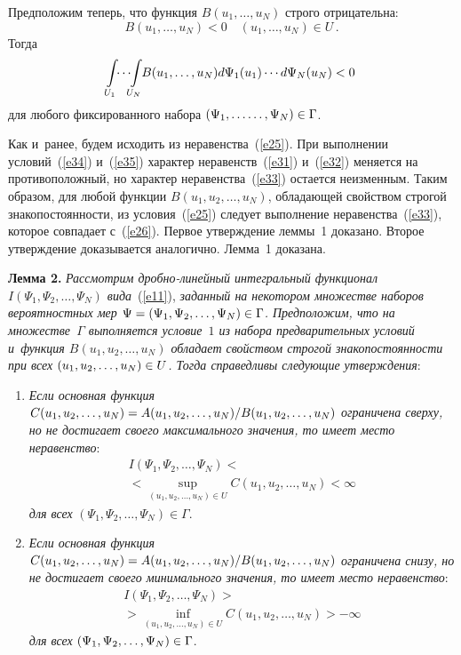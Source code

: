 \begin{multicols}{2}
Предположим теперь, что функция $B(u_1,\ldots, u_N)$ строго отрицательна:
\begin{equation}
B(u_1,\ldots, u_N)<0 \quad \left(u_1, \ldots, u_N\right)\in U\,. 
\label{e34}
\end{equation}
Тогда
\begin{multline}
\hspace*{-6pt}\int\limits_{U_1}\!\!\cdots\!\! \int\limits_{U_N}\!\!B\!\left(u_1,\ldots, u_N\right)\!
 d\Psi_1(u_1) \cdots d\Psi_N(u_N)<0 \!\!\!
 \label{e35}
\end{multline}
для любого фиксированного набора $(\Psi_1, \ldots\linebreak \ldots, \Psi_N)\hm\in \Gamma$.

Как и~ранее, будем исходить из неравенства~(\ref{e25}). 
При выполнении условий~(\ref{e34}) и~(\ref{e35}) характер неравенств~(\ref{e31}) 
и~(\ref{e32}) меняется на противоположный, но характер неравенства~(\ref{e33}) 
остается неизменным. Таким образом, для любой функции 
$B(u_1, u_2,\ldots, u_N)$, обладающей свойством строгой знакопостоянности, 
из условия~(\ref{e25}) следует выполнение неравенства~(\ref{e33}), 
которое совпадает с~(\ref{e26}). Первое утверждение леммы~1 доказано. 
Второе утверждение доказывается аналогично. Лемма~1 доказана.

\smallskip

\noindent
\textbf{Лемма 2.} \textit{Рассмотрим дроб\-но-ли\-ней\-ный интегральный функционал 
$I(\Psi_1, \Psi_2,\ldots, \Psi_N)$ вида}~(\ref{e11}), 
\textit{заданный на некотором множестве наборов вероятностных мер 
$\Psi\hm=(\Psi_1, \Psi_2,\ldots, \Psi_N)\hm\in \Gamma$. Предпо\-ложим, что на 
множестве~$\Gamma$ выполняется условие~$1$ из набора предварительных условий 
и~функция $B(u_1, u_2,\ldots, u_N)$ обладает свойством строгой знакопостоянности 
при всех $(u_1, u_2,\ldots, u_N)\hm\in U$. Тогда справедливы следующие утверждения}:
\begin{enumerate}[1.]
\item \textit{Если основная функция $C(u_1, u_2,\ldots, u_N)\hm=
{A(u_1, u_2,\ldots, u_N)}/{B(u_1, u_2,\ldots, u_N)}$ ограничена сверху, 
но не достигает своего максимального 
значения, то имеет место неравенство}:
\begin{multline}
I\left(\Psi_1, \Psi_2,\ldots, \Psi_N\right)<{}\\
{}< \sup\limits_{(u_1, u_2,\ldots, u_N)\in U}
 C\left(u_1, u_2,\ldots, u_N\right)<\infty \label{e36}
\end{multline}
\textit{для всех} $(\Psi_1, \Psi_2,\ldots, \Psi_N)\in \Gamma$.
\item \textit{Если основная функция $C(u_1, u_2,\ldots, u_N)\hm=
{A(u_1, u_2,\ldots, u_N)}/{B(u_1, u_2,\ldots, u_N)}$ ограничена снизу, 
но не достигает своего минимального значения, то имеет место неравенство}:
\begin{multline*}
I\left(\Psi_1, \Psi_2,\ldots, \Psi_N\right)>{}\\
{}> \inf\limits_{(u_1, u_2,\ldots, u_N)\in U} 
C\left(u_1, u_2,\ldots, u_N\right)>-\infty 
\end{multline*}
\textit{для всех} $(\Psi_1, \Psi_2,\ldots, \Psi_N)\hm\in \Gamma$.
\end{enumerate}


\end{multicols}
